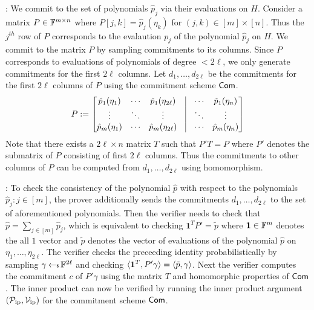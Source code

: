 : We commit to the
set of polynomials $\hat{p}_j$ via their evaluations on $H$. Consider a matrix
$P\in \mathbb{F}^{m\times n}$ where $P[j,k]=\hat{p}_j(\eta_k)$ for $(j,k)\in [m]\times
[n]$. Thus the $j^{th}$ row of $P$ corresponds to the evalaution $p_j$ of the polynomial
$\hat{p}_j$ on $H$. We commit to the matrix $P$ by sampling commitments to its
columns. Since $P$ corresponds to evaluations of polynomials of degree
$<2\ell$, we only generate commitments for the first $2\ell$ columns. Let
$d_1,\ldots,d_{2\ell}$ be the commitments for the first $2\ell$ columns of $P$
using the commitment scheme $\mathsf{Com}$. 
\begin{equation*}
P := \begin{bmatrix}
\hat{p}_1(\eta_1) & \cdots & \hat{p}_1(\eta_{2\ell}) & \vline & \cdots &
\hat{p}_1(\eta_n) \\
\vdots & \ddots & \vdots & \vline & \ddots & \vdots \\
\hat{p}_m(\eta_1) & \cdots & \hat{p}_m(\eta_{2\ell}) & \vline & \cdots &
\hat{p}_m(\eta_n)
\end{bmatrix}
\end{equation*}
Note that there exists a $2\ell\times n$ matrix $T$ such that $P'T = P$ where $P'$ denotes
the submatrix of $P$ consisting of first $2\ell$ columns. Thus the commitments
to other columns of $P$ can be computed from $d_1,\ldots,d_{2\ell}$ using
homomorphism. \smallskip

: To check the consistency of
the polynomial $\hat{p}$ with respect to the polynomials $\hat{p}_j:j\in [m]$,
the prover additionally sends the commitments $d_1,\ldots,d_{2\ell}$ to the set
of aforementioned polynomials. Then the verifier needs to check that
$\hat{p}=\sum_{j\in [m]}\hat{p}_j$, which is equivalent to checking
$\bm{1}^TP'=\tilde{p}$ where $\bm{1}\in \mathbb{F}^m$ denotes the all $1$ vector and
$\tilde{p}$ denotes the vector of evaluations of the polynomial $\hat{p}$ on
$\eta_1,\ldots,\eta_{2\ell}$. The verifier checks the preceeding identity
probabilistically by sampling $\gamma\hskip2.3pt{\gets\!\!\mbox{\tiny${\$}$\normalsize}}\, \mathbb{F}^{2\ell}$ and checking
$\langle \bm{1}^T,P'\gamma\rangle=\langle \tilde{p},\gamma\rangle$. Next the verifier
computes the commitment $c$ of $P'\gamma$ using the matrix $T$ and homomorphic
properties of $\mathsf{Com}$. The inner product can now be verified by running the
inner product argument $(\mathcal{P}_\mathrm{ip},\mathcal{V}_\mathrm{ip})$ for the commitment scheme
$\mathsf{Com}$.\smallskip

